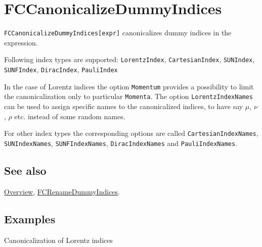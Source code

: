 \documentclass[../FeynCalcManual.tex]{subfiles}
\begin{document}
\hypertarget{fccanonicalizedummyindices}{%
\section{FCCanonicalizeDummyIndices}\label{fccanonicalizedummyindices}}

\texttt{FCCanonicalizeDummyIndices[\allowbreak{}expr]} canonicalizes
dummy indices in the expression.

Following index types are supported: \texttt{LorentzIndex},
\texttt{CartesianIndex}, \texttt{SUNIndex}, \texttt{SUNFIndex},
\texttt{DiracIndex}, \texttt{PauliIndex}

In the case of Lorentz indices the option \texttt{Momentum} provides a
possibility to limit the canonicalization only to particular
\texttt{Momenta}. The option \texttt{LorentzIndexNames} can be used to
assign specific names to the canonicalized indices, to have say \(\mu\),
\(\nu\), \(\rho\) etc. instead of some random names.

For other index types the corresponding options are called
\texttt{CartesianIndexNames}, \texttt{SUNIndexNames},
\texttt{SUNFIndexNames}, \texttt{DiracIndexNames} and
\texttt{PauliIndexNames}.

\subsection{See also}

\hyperlink{toc}{Overview},
\hyperlink{fcrenamedummyindices}{FCRenameDummyIndices}.

\subsection{Examples}

Canonicalization of Lorentz indices

\begin{Shaded}
\begin{Highlighting}[]
\OperatorTok{[}\OperatorTok{,}\OperatorTok{]}\OperatorTok{[}\OperatorTok{,}\OperatorTok{]} \SpecialCharTok{+}\OperatorTok{[}\OperatorTok{,}\OperatorTok{]}\OperatorTok{[}\OperatorTok{,}\OperatorTok{]} \SpecialCharTok{+}\OperatorTok{[}\OperatorTok{,}\OperatorTok{]}\OperatorTok{[}\OperatorTok{,}\OperatorTok{]} 
 
\OperatorTok{[}\SpecialCharTok{\%}\OperatorTok{]} \SpecialCharTok{//}
\end{Highlighting}
\end{Shaded}
\end{document}
